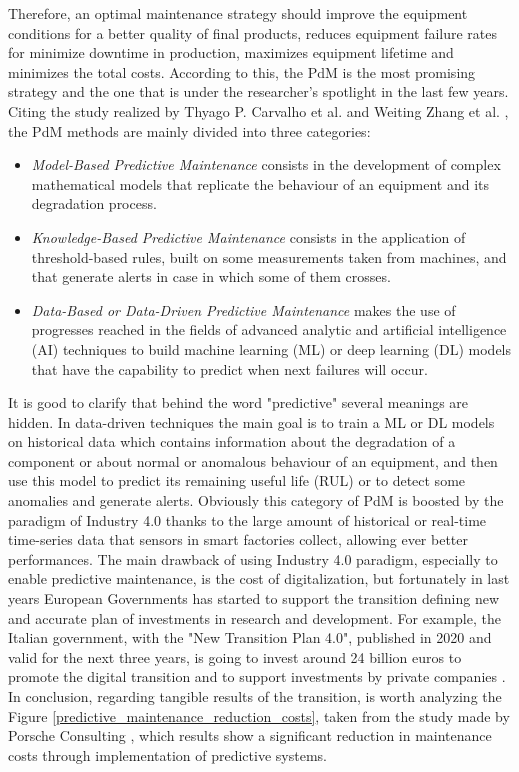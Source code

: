 Therefore, an optimal maintenance strategy should improve the equipment conditions for a better quality of final products, reduces equipment failure rates for minimize downtime in production, maximizes equipment lifetime and minimizes the total costs. According to this, the PdM is the most promising strategy and the one that is under the researcher's spotlight in the last few years. \\ 
Citing the study realized by Thyago P. Carvalho et al. \cite{3SystematicLiteratureReviewML} and Weiting Zhang et al. \cite{2DataDrivenMaintenance}, the PdM methods are mainly divided into three categories: 
\begin{itemize}
\item{\textit{Model-Based Predictive Maintenance} consists in the development of complex mathematical models that replicate the behaviour of an equipment and its degradation process.}
\item{\textit{Knowledge-Based Predictive Maintenance} consists in the application of threshold-based rules, built on some measurements taken from machines, and that generate alerts in case in which some of them crosses.}
\item{\textit{Data-Based or Data-Driven Predictive Maintenance} makes the use of progresses reached in the fields of advanced analytic and artificial intelligence (AI) techniques to build machine learning (ML) or deep learning (DL) models that have the capability to predict when next failures will occur. }
\end{itemize}

It is good to clarify that behind the word "predictive" several meanings are hidden. In data-driven techniques the main goal is to train a ML or DL models on historical data which contains information about the degradation of a component or about normal or anomalous behaviour of an equipment, and then use this model to predict its remaining useful life (RUL) or to detect some anomalies and generate alerts. Obviously this category of PdM is boosted by the paradigm of Industry 4.0 thanks to the large amount of historical or real-time time-series data that sensors in smart factories collect, allowing ever better performances.
The main drawback of using Industry 4.0 paradigm, especially to enable predictive maintenance, is the cost of digitalization, but fortunately in last years European Governments has started to support the transition defining new and accurate plan of investments in research and development. For example, the Italian government, with the "New Transition Plan 4.0", published in 2020 and valid for the next three years, is going to invest around 24 billion euros to promote the digital transition and to support investments by private companies \cite{12MiseNuovoPianoTransizione}. \\ 
In conclusion, regarding tangible results of the transition, is worth analyzing the Figure \ref{predictive_maintenance_reduction_costs}, taken from the study made by Porsche Consulting \cite{11PorscheStudy}, which results show a significant reduction in maintenance costs through implementation of predictive systems.


